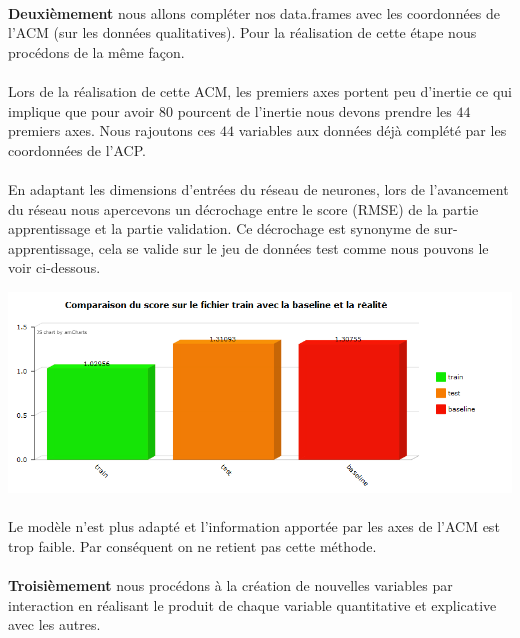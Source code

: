 \documentclass[14pt, openany]{article}
\begin{document}
\paragraph{}
\textbf{Deuxièmement} nous allons compléter nos data.frames avec les coordonnées de l'ACM (sur les données qualitatives). Pour la réalisation de cette étape nous procédons de la même façon.

\paragraph{}
Lors de la réalisation de cette ACM, les premiers axes portent peu d'inertie ce qui implique que pour avoir $80$ pourcent de l'inertie nous devons prendre les $44$ premiers axes. Nous rajoutons ces $44$ variables aux données déjà complété par les coordonnées de l'ACP.

\paragraph{}
En adaptant les dimensions d'entrées du réseau de neurones, lors de l'avancement du réseau nous apercevons un décrochage entre le score (RMSE) de la partie apprentissage et la partie validation. Ce décrochage est synonyme de sur-apprentissage, cela se valide sur le jeu de données test comme nous pouvons le voir ci-dessous.

\begin{center}
\includegraphics[scale=0.7]{Images/deepacm.png}
\end{center}

\paragraph{}
Le modèle n'est plus adapté et l'information apportée par les axes de l'ACM est trop faible. Par conséquent on ne retient pas cette méthode.

\paragraph{}
\textbf{Troisièmement} nous procédons à la création de nouvelles variables par interaction en réalisant le produit de chaque variable quantitative et explicative avec les autres.
\end{document}
